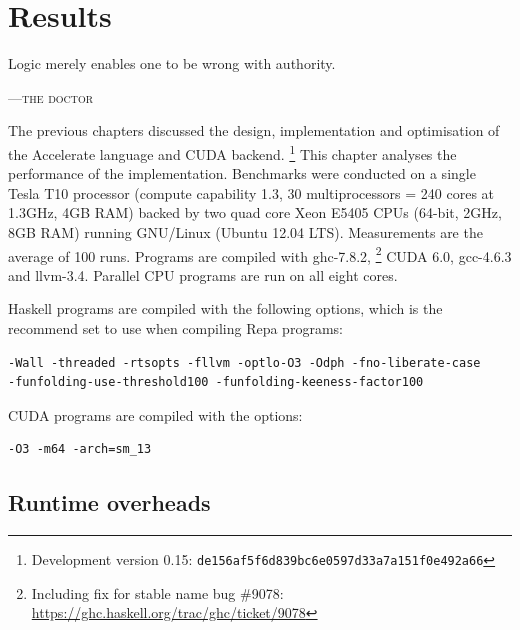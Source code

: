 %
%

\chapter{Results}
\label{ch:results}

\epigraph{Logic merely enables one to be wrong with authority.}%
{\textsc{---the doctor}} %




The previous chapters discussed the design, implementation and optimisation of
the Accelerate language and CUDA backend.%
\footnote{Development version 0.15: \texttt{de156af5f6d839bc6e0597d33a7a151f0e492a66}}
This chapter analyses the performance of the implementation. Benchmarks were
conducted on a single Tesla T10 processor (compute capability 1.3, 30
multiprocessors = 240 cores at 1.3GHz, 4GB RAM) backed by two quad core Xeon
E5405 CPUs (64-bit, 2GHz, 8GB RAM) running GNU/Linux (Ubuntu 12.04 LTS).
Measurements are the average of 100 runs. Programs are compiled with
ghc-7.8.2,%
\footnote{Including fix for stable name bug \#9078: \url{https://ghc.haskell.org/trac/ghc/ticket/9078}}
CUDA 6.0, gcc-4.6.3 and llvm-3.4. Parallel CPU programs are run on all eight
cores.

Haskell programs are compiled with the following options, which is the recommend
set to use when compiling Repa programs:
%
\begin{lstlisting}
-Wall -threaded -rtsopts -fllvm -optlo-O3 -Odph -fno-liberate-case
-funfolding-use-threshold100 -funfolding-keeness-factor100
\end{lstlisting}
%
CUDA programs are compiled with the options:
%
\begin{lstlisting}
-O3 -m64 -arch=sm_13
\end{lstlisting}


\section{Runtime overheads}

